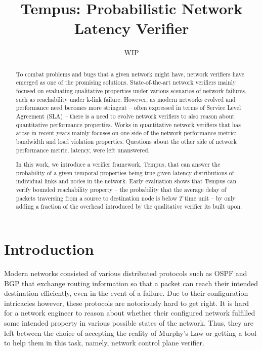 \documentclass[10pt,sigconf,letterpaper,anonymous,nonacm]{acmart}
\title{Tempus: Probabilistic Network Latency Verifier}
\author{WIP}
\begin{document}
\begin{abstract}
    To combat problems and bugs that a given network might have, network verifiers have emerged as 
    one of the promising solutions. 
    State-of-the-art network verifiers mainly focused on evaluating qualitative properties under 
    various scenarios of network failures, such as reachability under k-link failure. 
    However, as modern networks evolved and performance need becomes more stringent -- often 
    expressed in terms of Service Level Agreement (SLA) -- there is a need to evolve network 
    verifiers to also reason about quantitative performance properties. 
    Works in quantitative network verifiers that has arose in recent years mainly focuses on one 
    side of the network performance metric: bandwidth and load violation properties. 
    Questions about the other side of network performance metric, latency, were left unanswered. 

    In this work, we introduce a verifier framework, Tempus, that can answer the probability of 
    a given temporal properties being true given latency distributions of individual links and 
    nodes in the network. 
    Early evaluation shows that Tempus can verify bounded reachability property -- the probability
    that the average delay of packets traversing from a source to destination node is below $T$
    time unit -- by only adding a fraction of the overhead introduced by the qualitative verifier 
    its built upon.
\end{abstract}

\maketitle

\section{Introduction}
Modern networks consisted of various distributed protocols such as OSPF and BGP that exchange 
routing information so that a packet can reach their intended destination efficiently, even in the 
event of a failure.
Due to their configuration intricacies however, these protocols are notoriously hard to get right. 
It is hard for a network engineer to reason about whether their configured network fulfilled some 
intended property in various possible states of the network. 
Thus, they are left between the choice of accepting the reality of Murphy's Law or getting a tool 
to help them in this task, namely, network control plane verifier.
\end{document}
